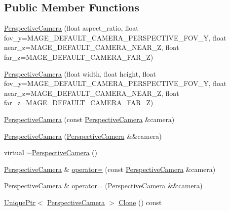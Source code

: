 \subsection*{Public Member Functions}
\begin{DoxyCompactItemize}
\item 
\hyperlink{classmage_1_1_perspective_camera_a118a233aa484bbff31032703087a5a8c}{Perspective\+Camera} (float aspect\+\_\+ratio, float fov\+\_\+y=M\+A\+G\+E\+\_\+\+D\+E\+F\+A\+U\+L\+T\+\_\+\+C\+A\+M\+E\+R\+A\+\_\+\+P\+E\+R\+S\+P\+E\+C\+T\+I\+V\+E\+\_\+\+F\+O\+V\+\_\+Y, float near\+\_\+z=M\+A\+G\+E\+\_\+\+D\+E\+F\+A\+U\+L\+T\+\_\+\+C\+A\+M\+E\+R\+A\+\_\+\+N\+E\+A\+R\+\_\+Z, float far\+\_\+z=M\+A\+G\+E\+\_\+\+D\+E\+F\+A\+U\+L\+T\+\_\+\+C\+A\+M\+E\+R\+A\+\_\+\+F\+A\+R\+\_\+Z)
\item 
\hyperlink{classmage_1_1_perspective_camera_af04c3995faa777606a1cd610acad43c0}{Perspective\+Camera} (float width, float height, float fov\+\_\+y=M\+A\+G\+E\+\_\+\+D\+E\+F\+A\+U\+L\+T\+\_\+\+C\+A\+M\+E\+R\+A\+\_\+\+P\+E\+R\+S\+P\+E\+C\+T\+I\+V\+E\+\_\+\+F\+O\+V\+\_\+Y, float near\+\_\+z=M\+A\+G\+E\+\_\+\+D\+E\+F\+A\+U\+L\+T\+\_\+\+C\+A\+M\+E\+R\+A\+\_\+\+N\+E\+A\+R\+\_\+Z, float far\+\_\+z=M\+A\+G\+E\+\_\+\+D\+E\+F\+A\+U\+L\+T\+\_\+\+C\+A\+M\+E\+R\+A\+\_\+\+F\+A\+R\+\_\+Z)
\item 
\hyperlink{classmage_1_1_perspective_camera_a198d1460d9312af27ed6ef2ac28b616d}{Perspective\+Camera} (const \hyperlink{classmage_1_1_perspective_camera}{Perspective\+Camera} \&camera)
\item 
\hyperlink{classmage_1_1_perspective_camera_a04531e5b956e72300337571e0eb7143d}{Perspective\+Camera} (\hyperlink{classmage_1_1_perspective_camera}{Perspective\+Camera} \&\&camera)
\item 
virtual \hyperlink{classmage_1_1_perspective_camera_a47ba88d7458528795dd832474cdb3eb9}{$\sim$\+Perspective\+Camera} ()
\item 
\hyperlink{classmage_1_1_perspective_camera}{Perspective\+Camera} \& \hyperlink{classmage_1_1_perspective_camera_a0fe5ef8bd4d28efa8e4851a8055b6fa5}{operator=} (const \hyperlink{classmage_1_1_perspective_camera}{Perspective\+Camera} \&camera)
\item 
\hyperlink{classmage_1_1_perspective_camera}{Perspective\+Camera} \& \hyperlink{classmage_1_1_perspective_camera_a338c75900237f3623b31b0231a5f5782}{operator=} (\hyperlink{classmage_1_1_perspective_camera}{Perspective\+Camera} \&\&camera)
\item 
\hyperlink{namespacemage_a8c307fbcc33bce9b7f2aa4c26c3b95cf}{Unique\+Ptr}$<$ \hyperlink{classmage_1_1_perspective_camera}{Perspective\+Camera} $>$ \hyperlink{classmage_1_1_perspective_camera_a21545965da7ef1b6f99887bb6d2bb095}{Clone} () const

\end{DoxyCompactItemize}
